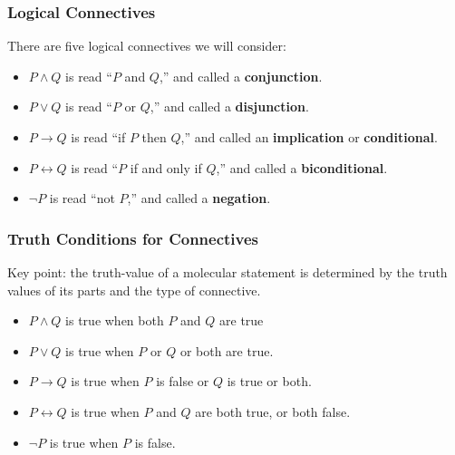 \documentclass[11pt, compress]{beamer}
\newcommand{\terminology}[1]{\textbf{#1}}
\renewcommand{\iff}{\leftrightarrow}
\newcommand{\imp}{\rightarrow}
\begin{document}
\begin{frame}
\frametitle{Logical Connectives}
 There are five logical connectives we will consider:
\pause 

\begin{itemize}[<+->]
\item{} \(P \wedge Q\) is read ``\(P\) and \(Q\),'' and called a \terminology{conjunction}.

\item{} \(P \vee Q\) is read ``\(P\) or \(Q\),'' and called a \terminology{disjunction}.

\item{} \(P \imp Q\) is read ``if \(P\) then \(Q\),'' and called an \terminology{implication} or \terminology{conditional}.

\item{} \(P \iff Q\) is read ``\(P\) if and only if \(Q\),'' and called a \terminology{biconditional}.

\item{} \(\neg P\) is read ``not \(P\),'' and called a \terminology{negation}.
\end{itemize}

\end{frame}
 
\begin{frame}
\frametitle{Truth Conditions for Connectives}
 Key point: the truth-value of a molecular statement is determined by the truth values of its parts and the type of connective.
\pause 

\begin{itemize}[<+->]
\item{} \(P \wedge Q\) is true when both \(P\) and \(Q\) are true

\item{} \(P \vee Q\) is true when \(P\) or \(Q\) or both are true.

\item{} \(P \imp Q\) is true when \(P\) is false or \(Q\) is true or both.

\item{} \(P \iff Q\) is true when \(P\) and \(Q\) are both true, or both false.

\item{} \(\neg P\) is true when \(P\) is false.
\end{itemize}

\end{frame}
 
\end{document}
